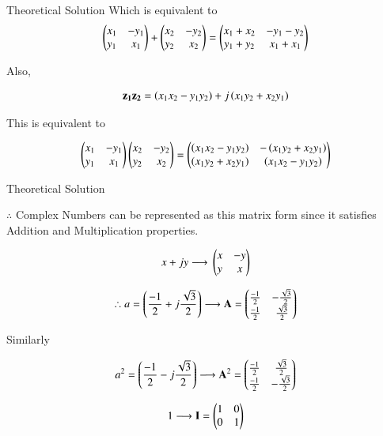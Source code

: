 \documentclass{beamer}
\begin{document}
\begin{frame}{Theoretical Solution}
Which is equivalent to 
\begin{align}
    \begin{pmatrix}x_1 & -y_1 \\ y_1 & x_1 \end{pmatrix} + \begin{pmatrix}x_2 & -y_2 \\ y_2 & x_2 \end{pmatrix} = \begin{pmatrix}x_1+x_2 & -y_1-y_2 \\ y_1+y_2 & x_1+x_1\end{pmatrix}
\end{align}

Also, 

\begin{align}
    \mathbf{z_1}\mathbf{z_2} = \left(x_1x_2 - y_1y_2\right) + j\left(x_1y_2 + x_2y_1\right)
\end{align}

This is equivalent to 

\begin{align}
    \begin{pmatrix}x_1 & -y_1 \\ y_1 & x_1\end{pmatrix}\begin{pmatrix}x_2 & -y_2 \\ y_2 & x_2 \end{pmatrix} = \begin{pmatrix}\left(x_1x_2 - y_1y_2\right) & -\left(x_1y_2 + x_2y_1\right) \\ \left(x_1y_2 + x_2y_1\right) & \left(x_1x_2 - y_1y_2\right)\end{pmatrix}
\end{align}
 
\end{frame}

\begin{frame}{Theoretical Solution}

$\therefore$ Complex Numbers can be represented as this matrix form since it satisfies Addition and Multiplication properties. 
 
\begin{align}
    x+jy \longrightarrow{} \begin{pmatrix}x & -y \\ y & x \end{pmatrix}
\end{align}

\begin{align}
    \therefore a = \left(\frac{-1}{2} + j\frac{\sqrt{3}}{2}\right) \longrightarrow \mathbf{A} = \begin{pmatrix}\frac{-1}{2}&-\frac{\sqrt{3}}{2}\\\frac{-1}{2} & \frac{\sqrt{3}}{2}\end{pmatrix}
\end{align}

Similarly 

\begin{align}
    a^2 = \left(\frac{-1}{2} - j\frac{\sqrt{3}}{2}\right) \longrightarrow \mathbf{A}^2 = \begin{pmatrix}\frac{-1}{2}&\frac{\sqrt{3}}{2}\\\frac{-1}{2} & -\frac{\sqrt{3}}{2}\end{pmatrix}
\end{align}

\begin{align}
    1 \longrightarrow \mathbf{I} = \begin{pmatrix}1&0\\0&1\end{pmatrix}
\end{align}
\end{frame}
\end{document}
